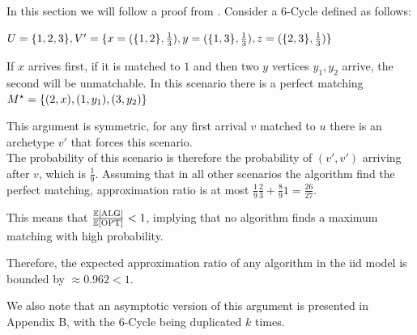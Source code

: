 In this section we will follow a proof from \cite{obmStochastic}. Consider a 6-Cycle defined as follows:
\begin{definition}
	$U=\{1,2,3\},V'=\{x=(\{1,2\},\frac{1}{3}),y=(\{1,3\},\frac{1}{3}),z=(\{2,3\},\frac{1}{3})\}$
\end{definition}
\begin{figure}[H]
	\centering
	
\end{figure}
If $x$ arrives first, if it is matched to $1$ and then two $y$ vertices $y_1,y_2$ arrive, the second will be unmatchable. In this scenario there is a perfect matching $M^\star=\{(2,x),(1,y_1),(3,y_2)\}$

This argument is symmetric, for any first arrival $v$ matched to $u$ there is an archetype $v'$ that forces this scenario.\\
The probability of this scenario is therefore the probability of $(v',v')$ arriving after $v$, which is $\frac{1}{9}$. Assuming that in all other scenarios the algorithm find the perfect matching, approximation ratio is at most $\frac{1}{9}\frac{2}{3}+\frac{8}{9}1=\frac{26}{27}$.

This means that $\frac{\mathbb{E}[\mathrm{ALG}]}{\mathbb{E}[\mathrm{OPT}]}<1$, implying that no algorithm finds a maximum matching with high probability.

Therefore, the expected approximation ratio of any algorithm in the iid model is bounded by $\approx0.962<1$.

We also note that an asymptotic version of this argument is presented in \cite{obmStochastic} Appendix B, with the 6-Cycle being duplicated $k$ times.